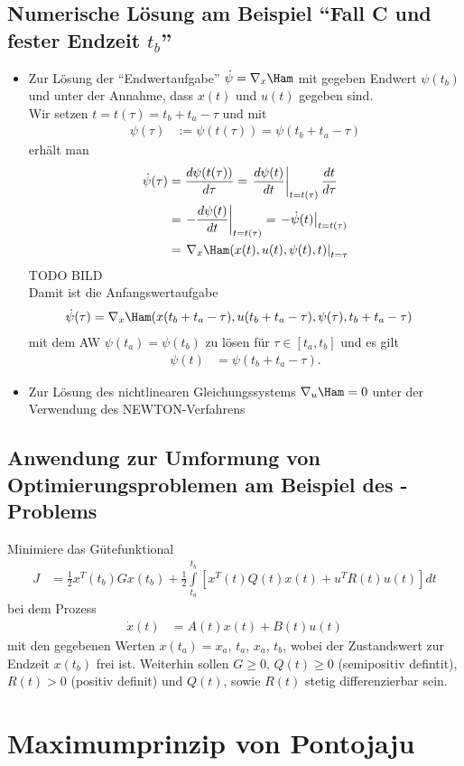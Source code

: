 \subsection{Numerische Lösung am Beispiel "`Fall C und fester Endzeit $t_b$"'}
\begin{itemize}
  \item Zur Lösung der "`Endwertaufgabe"' $\dot{\psi}=\nabla_x \Ham$ mit gegeben Endwert $\psi(t_b)$ und unter der Annahme, dass $x(t)$ und $u(t)$ gegeben sind.\\
  		Wir setzen $t=t(\tau)=t_b+t_a-\tau$ und mit 
  		\begin{align*}
  			\psi(\tau) & := \psi(t(\tau)) = \psi(t_b+t_a-\tau)
  		\end{align*}
  		erhält man 
  		\begin{align*}
  			\dot{\psi}(\tau) & = \frac{d\psi(t(\tau))}{d\tau} = \left.\frac{d\psi(t)}{dt}\right|_{t=t(\tau)}\frac{dt}{d\tau}\\
  			& = \left.-\frac{d\psi(t)}{dt}\right|_{t=t(\tau)}=\left.-\dot{\psi}(t)\right|_{t=t(\tau)}\\
  			& = \left.\nabla_x \Ham(x(t),u(t),\psi(t),t)\right|_{t=\tau}
  		\end{align*}
  		TODO BILD\\
  		Damit ist die Anfangswertaufgabe 
  		\begin{align*}
  			\dot{\psi}(\tau) & = \nabla_x \Ham(x(t_b+t_a-\tau),u(t_b+t_a-\tau),\psi(\tau),t_b+t_a-\tau)
  		\end{align*}
  		mit dem \ac{AW} $\psi(t_a)=\psi(t_b)$ zu lösen für $\tau\in[t_a,t_b]$ und es gilt
  		\begin{align*}
  		\psi(t) & = \psi(t_b+t_a-\tau).
  		\end{align*}
  \item Zur Lösung des nichtlinearen Gleichungssystems $\nabla_u \Ham =0$ unter der Verwendung des NEWTON-Verfahrens
\end{itemize}

\subsection{Anwendung zur Umformung von Optimierungsproblemen am Beispiel des -Problems}
Minimiere das Gütefunktional
\begin{align*}
	J  & = \frac12 x^T(t_b)Gx(t_b)+\frac12\int\limits_{t_a}^{t_b}\left[x^T(t)Q(t)x(t)+u^TR(t)u(t)\right]dt
\end{align*}
bei dem Prozess 
\begin{align*}
	\dot{x}(t) & = A(t)x(t)+B(t)u(t)
\end{align*}
mit den gegebenen Werten $x(t_a)=x_a$, $t_a$, $x_a$, $t_b$, wobei der Zustandswert zur Endzeit $x(t_b)$ frei ist. Weiterhin sollen $G\ge 0$, $Q(t)\ge 0$ (semipositiv defintit), $R(t)>0$
(positiv definit) und $Q(t)$, sowie $R(t)$ stetig differenzierbar sein.

\section{Maximumprinzip von Pontojaju}
